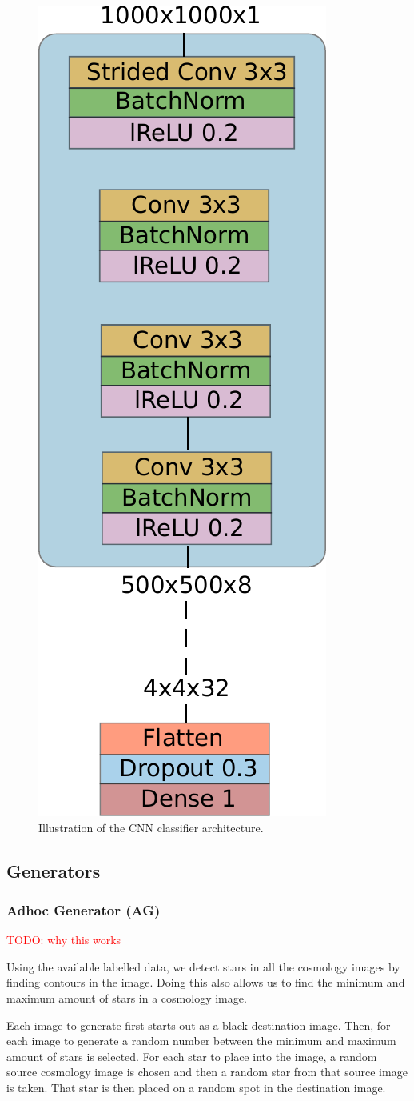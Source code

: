 \documentclass[10pt,conference,compsocconf]{IEEEtran}
\newcommand\TODO[1]{\textcolor{red}{#1}} %
\begin{document}
\begin{figure}
    \centering
    \includegraphics[width=0.4\columnwidth]{assets/nn_classifier_arch.pdf}
    \caption{Illustration of the CNN classifier architecture.}
    \label{fig:nn_classifier_arch}
\end{figure}

\subsection{Generators}
\subsubsection{Adhoc Generator (AG)} %

\TODO{TODO: why this works}

Using the available labelled data, we detect stars in all the cosmology images by finding contours in the image. Doing this also allows us to find the minimum and maximum amount of stars in a cosmology image. 

Each image to generate first starts out as a black destination image. Then, for each image to generate a random number between the minimum and maximum amount of stars is selected. For each star to place into the image, a random source cosmology image is chosen and then a random star from that source image is taken. That star is then placed on a random spot in the destination image.
\end{document}
